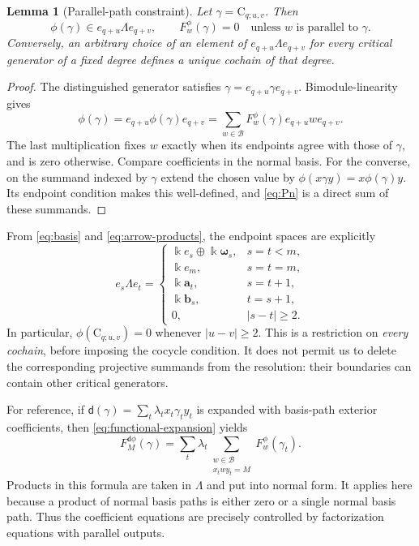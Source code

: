 \documentclass[a4paper,11pt,oneside,reqno]{amsart}
\newtheorem{lemma}[theorem]{Lemma}
\theoremstyle{definition}
\numberwithin{equation}{section}
\begin{document}
	\begin{lemma}[Parallel-path constraint]\label{lem:parallel}
		Let $\gamma=\mathrm{C}_{q;u,v}$.  Then
		\begin{equation}\label{eq:parallel-value}
			\phi(\gamma)\in e_{q+u}\Lambda e_{q+v},
			\qquad
			F_w^\phi(\gamma)=0\quad\text{unless }w\text{ is parallel to }\gamma.
		\end{equation}
		Conversely, an arbitrary choice of an element of
		$e_{q+u}\Lambda e_{q+v}$ for every critical generator of a fixed degree
		defines a unique cochain of that degree.
	\end{lemma}
	
	\begin{proof}
		The distinguished generator satisfies
		$\gamma=e_{q+u}\gamma e_{q+v}$.  Bimodule-linearity gives
		\[
		\phi(\gamma)=e_{q+u}\phi(\gamma)e_{q+v}
		=\sum_{w\in\mathcal B}F_w^\phi(\gamma)e_{q+u}we_{q+v}.
		\]
		The last multiplication fixes $w$ exactly when its endpoints agree with
		those of $\gamma$, and is zero otherwise.  Compare coefficients in the normal
		basis.  For the converse, on the summand indexed by $\gamma$ extend the
		chosen value by $\phi(x\gamma y)=x\phi(\gamma)y$.  Its endpoint condition makes this
		well-defined, and \eqref{eq:Pn} is a direct sum of these summands.
	\end{proof}
	
	From \eqref{eq:basis} and \eqref{eq:arrow-products}, the endpoint spaces
	are explicitly
	\begin{equation}\label{eq:corner-spaces}
		e_s\Lambda e_t=
		\begin{cases}
			\Bbbk e_s\oplus \Bbbk\boldsymbol{\omega}_s,&s=t<m,\\
			\Bbbk e_m,&s=t=m,\\
			\Bbbk\mathbf{a}_t,&s=t+1,\\
			\Bbbk\mathbf{b}_s,&t=s+1,\\
			0,&|s-t|\geq2.
		\end{cases}
	\end{equation}
	In particular, $\phi(\mathrm{C}_{q;u,v})=0$ whenever $|u-v|\geq2$.
	This is a restriction on \emph{every cochain}, before imposing the
	cocycle condition.  It does not permit us to delete the corresponding
	projective summands from the resolution: their boundaries can contain
	other critical generators.
	
	For reference, if
	$\mathsf d(\gamma)=\sum_t\lambda_t x_t\gamma_ty_t$ is expanded with basis-path exterior
	coefficients, then \eqref{eq:functional-expansion} yields
	\begin{equation}\label{eq:factorization-cochain}
		F_M^{\mathsf d\phi}(\gamma)
		=\sum_t\lambda_t
		\sum_{\substack{w\in\mathcal B\\x_twy_t=M}}
		F_w^\phi(\gamma_t).
	\end{equation}
	Products in this formula are taken in $\Lambda$ and put into normal
	form.  It applies here because a product of normal basis paths is either
	zero or a single normal basis path.  Thus the coefficient equations are
	precisely controlled by factorization equations with parallel outputs.
	
\end{document}
